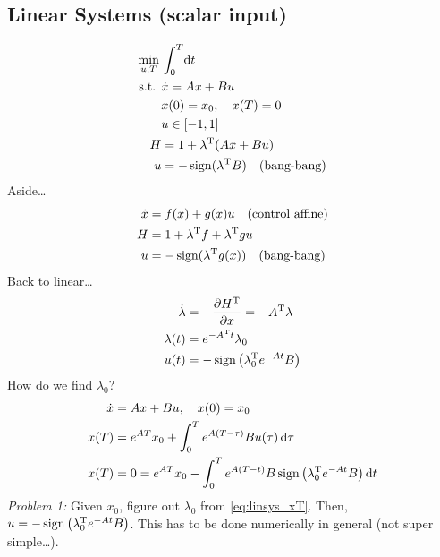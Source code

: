 \subsection{Linear Systems (scalar input)}
\begin{align}
  \min_{u,T} {} & \int_0^T \!\mathop{}\!\mathrm{d} t \\
  \text{s.t. } & \dot x = Ax + Bu \\
                & x(0) = x_0, \quad x(T) = 0 \\
                & u\in[-1,1] \\
  H &= 1 + \lambda^\text{T} (Ax + Bu) \\
  u &= -\operatorname{sign} (\lambda^\text{T} B) \quad \text{(bang-bang)}
\end{align}
Aside\dots
\begin{align}
  \dot x &= f(x) + g(x) u \quad \text{(control affine)} \\
  H &= 1 + \lambda^\text{T} f + \lambda^\text{T} g u \\
  u &= -\operatorname{sign} (\lambda^\text{T} g(x)) \quad \text{(bang-bang)}
\end{align}
Back to linear\dots
\begin{align}
  \dot\lambda &= -\frac{\partial H^\text{T}}{\partial x} = -A^\text{T}\lambda \\
  \lambda(t) &= e^{-A^\text{T} t} \lambda_0 \\
  u(t) &= -\operatorname{sign}\left( \lambda_0^\text{T} e^{-At} B \right)
\end{align}
How do we find $\lambda_0$?
\begin{align}
  \dot x &= Ax + Bu, \quad x(0) = x_0 \\
  x(T) &= e^{AT} x_0 + \int_0^T e^{A(T-\tau)} Bu(\tau) \mathop{}\!\mathrm{d}\tau \\
  x(T) &= 0 = e^{AT}x_0 - \int_0^T e^{A(T-t)} B \operatorname{sign} \left( \lambda_0^\text{T} e^{-At} B \right) \mathop{}\!\mathrm{d} t \label{eq:linsys_xT}
\end{align}
\emph{Problem 1:} Given $x_0$, figure out $\lambda_0$ from \eqref{eq:linsys_xT}. Then, $u=-\operatorname{sign}\left( \lambda_0^\text{T} e^{-At} B \right)$. This has to be done numerically in general (not super simple\dots).

